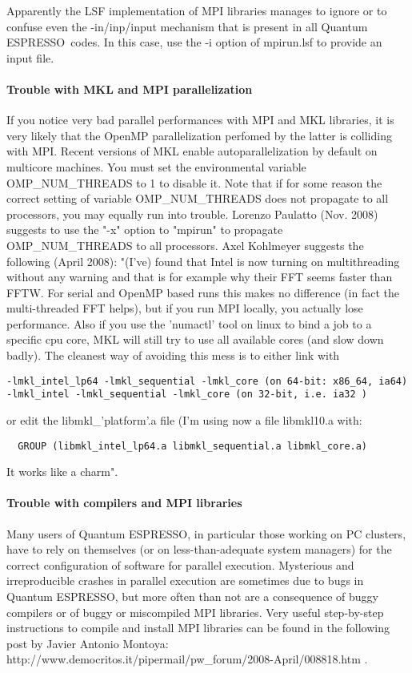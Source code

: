 \documentclass[12pt,a4paper]{article}
\def\qe{{\sc Quantum ESPRESSO}}
\begin{document}
Apparently the LSF implementation of MPI libraries manages to ignore or to
confuse even the -in/inp/input mechanism that is present in all
\qe\ codes. In this case, use the -i option of mpirun.lsf
to provide an input file.

\paragraph{Trouble with MKL and MPI parallelization}
If you notice very bad parallel performances with MPI and MKL libraries, 
it is very likely that the OpenMP parallelization perfomed by the latter 
is colliding with MPI. Recent versions of MKL enable autoparallelization
by default on multicore machines.  You must set the environmental variable
OMP\_NUM\_THREADS to 1 to disable it. 
Note that if for some reason the correct setting  of variable
OMP\_NUM\_THREADS  
does not propagate to all processors, you may equally run into trouble. 
Lorenzo Paulatto (Nov. 2008) suggests to use the "-x" option to "mpirun" to 
propagate OMP\_NUM\_THREADS to all processors.
Axel Kohlmeyer suggests the following (April 2008): 
"(I've) found that Intel is now turning on multithreading without any
warning and that is for example why their FFT seems faster than
FFTW. For serial and OpenMP based runs this makes no difference (in
fact the multi-threaded FFT helps), but if you run MPI locally, you
actually lose performance. Also if you use the 'numactl' tool on linux
to bind a job to a specific cpu core, MKL will still try to use all
available cores (and slow down badly). The cleanest way of avoiding
this mess is to either link with
\begin{verbatim}
-lmkl_intel_lp64 -lmkl_sequential -lmkl_core (on 64-bit: x86_64, ia64)
-lmkl_intel -lmkl_sequential -lmkl_core (on 32-bit, i.e. ia32 )
\end{verbatim}
or edit the libmkl\_'platform'.a file (I'm using now a file libmkl10.a with:
\begin{verbatim}
  GROUP (libmkl_intel_lp64.a libmkl_sequential.a libmkl_core.a)
\end{verbatim}
It works like a charm".

\paragraph{Trouble with compilers and MPI libraries}
Many users of \qe, in particular those working on PC clusters,
have to rely on themselves (or on less-than-adequate system managers) for 
the correct configuration of software for parallel execution. Mysterious and
irreproducible crashes in parallel execution are sometimes due to bugs
in \qe, but more often than not are a consequence of buggy
compilers or of buggy or miscompiled MPI libraries. Very useful step-by-step 
instructions to compile and install MPI libraries
can be found in the following post by Javier Antonio Montoya:\\
http://www.democritos.it/pipermail/pw\_forum/2008-April/008818.htm .
\end{document}
